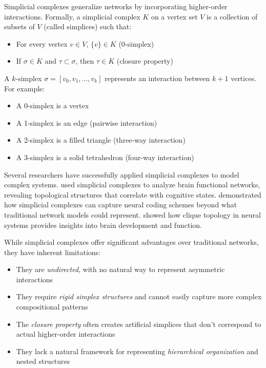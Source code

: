 Simplicial complexes generalize networks by incorporating higher-order interactions. Formally, a simplicial complex $K$ on a vertex set $V$ is a collection of subsets of $V$ (called simplices) such that:
\begin{itemize}
    \item For every vertex $v \in V$, $\{v\} \in K$ (0-simplex)
    \item If $\sigma \in K$ and $\tau \subset \sigma$, then $\tau \in K$ (closure property)
\end{itemize}

A $k$-simplex $\sigma = [v_0, v_1, ..., v_k]$ represents an interaction between $k+1$ vertices. For example:
\begin{itemize}
    \item A 0-simplex is a vertex
    \item A 1-simplex is an edge (pairwise interaction)
    \item A 2-simplex is a filled triangle (three-way interaction)
    \item A 3-simplex is a solid tetrahedron (four-way interaction)
\end{itemize}

Several researchers have successfully applied simplicial complexes to model complex systems. \citet{petri2014homological} used simplicial complexes to analyze brain functional networks, revealing topological structures that correlate with cognitive states. \citet{giusti2016two} demonstrated how simplicial complexes can capture neural coding schemes beyond what traditional network models could represent. \citet{sizemore2018importance} showed how clique topology in neural systems provides insights into brain development and function.

While simplicial complexes offer significant advantages over traditional networks, they have inherent limitations:
\begin{itemize}
    \item They are \textit{undirected}, with no natural way to represent asymmetric interactions
    \item They require \textit{rigid simplex structures} and cannot easily capture more complex compositional patterns
    \item The \textit{closure property} often creates artificial simplices that don't correspond to actual higher-order interactions
    \item They lack a natural framework for representing \textit{hierarchical organization} and nested structures
\end{itemize}

